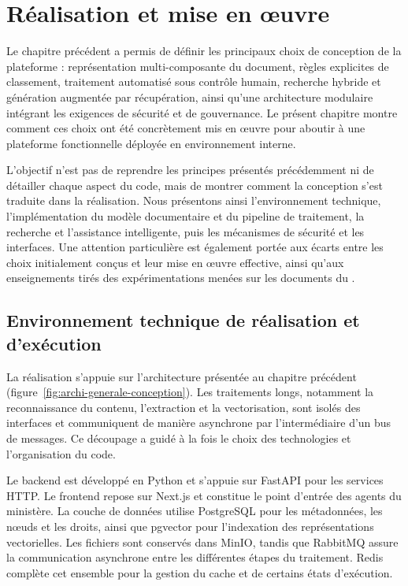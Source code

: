 \chapter{Réalisation et mise en œuvre}
\label{ch:realisation}

Le chapitre précédent a permis de définir les principaux choix de conception de la plateforme : représentation multi-composante du document, règles explicites de classement, traitement automatisé sous contrôle humain, recherche hybride et génération augmentée par récupération, ainsi qu'une architecture modulaire intégrant les exigences de sécurité et de gouvernance. Le présent chapitre montre comment ces choix ont été concrètement mis en œuvre pour aboutir à une plateforme fonctionnelle déployée en environnement interne.

L'objectif n'est pas de reprendre les principes présentés précédemment ni de détailler chaque aspect du code, mais de montrer comment la conception s'est traduite dans la réalisation. Nous présentons ainsi l'environnement technique, l'implémentation du modèle documentaire et du pipeline de traitement, la recherche et l'assistance intelligente, puis les mécanismes de sécurité et les interfaces. Une attention particulière est également portée aux écarts entre les choix initialement conçus et leur mise en œuvre effective, ainsi qu'aux enseignements tirés des expérimentations menées sur les documents du \nomMinistere{}.

\section{Environnement technique de réalisation et d'exécution}

La réalisation s'appuie sur l'architecture présentée au chapitre précédent (figure~\ref{fig:archi-generale-conception}). Les traitements longs, notamment la reconnaissance du contenu, l'extraction et la vectorisation, sont isolés des interfaces et communiquent de manière asynchrone par l'intermédiaire d'un bus de messages. Ce découpage a guidé à la fois le choix des technologies et l'organisation du code.

Le backend est développé en Python et s'appuie sur FastAPI pour les services HTTP. Le frontend repose sur Next.js et constitue le point d'entrée des agents du ministère. La couche de données utilise PostgreSQL pour les métadonnées, les nœuds et les droits, ainsi que pgvector pour l'indexation des représentations vectorielles. Les fichiers sont conservés dans MinIO, tandis que RabbitMQ assure la communication asynchrone entre les différentes étapes du traitement. Redis complète cet ensemble pour la gestion du cache et de certains états d'exécution.

